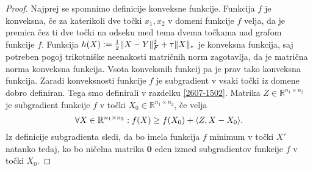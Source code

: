 \begin{proof} 
Najprej se spomnimo definicije konveksne funkcije. Funkcija $f$ je konveksna, če za katerikoli dve točki $x_1, x_2$ v domeni funkcije $f$ velja, da je premica čez ti dve točki na odseku med tema dvema točkama nad grafom funkcije $f$.
Funkcija $h(X) := \frac{1}{2} \lVert X-Y\rVert_F^2 + \tau\lVert X\rVert_* $ je konveksna funkcija, saj potreben pogoj trikotniške neenakosti matričnih norm zagotavlja, da je matrična norma konveksna funkcija. Vsota konveksnih funkcij pa je prav tako konveksna funkcija. 
Zaradi konveksnosti funkcije $f$ je 
subgradient v vsaki točki iz domene dobro definiran.
Tega smo definirali v razdelku \ref{2607-1502}.
Matrika $Z\in \mathbb R^{n_1\times n_2}$ je subgradient funkcije $f$ v točki 
$X_0\in \mathbb R^{n_1\times n_2}$,
če velja 
\[\forall X\in \mathbb R^{n_1\times n_2}: 
f(X) \geq  f(X_0) + \langle Z, X - X_0 \rangle.\]
Iz definicije subgradienta sledi, da bo imela funkcija $f$ minimum v točki $X'$ natanko tedaj,
ko bo ničelna matrika $\mathbf{0}$ eden izmed subgradientov funkcije $f$ v točki $X_0$.
\iffalse 
V minimumu funkcije $f$ bo eden od subgradientov iščemo minimum $X'$ funkcije $f$,  iščemo tako točko $X'$, da bo
\CG{eden izmed subgradientov po spremenljivki $X$} v točki $X'$ enak 0.  
\fi 


\end{proof}
